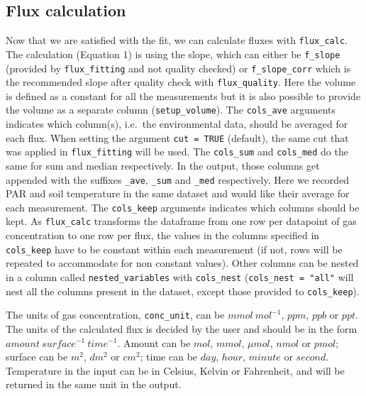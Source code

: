 \documentclass[
  letterpaper,
  DIV=11,
  numbers=noendperiod]{scrartcl}
\begin{document}
\subsection{Flux calculation}\label{sec-excalc}

Now that we are satisfied with the fit, we can calculate fluxes with
\texttt{flux\_calc}. The calculation (Equation 1) is using the slope,
which can either be \texttt{f\_slope} (provided by
\texttt{flux\_fitting} and not quality checked) or
\texttt{f\_slope\_corr} which is the recommended slope after quality
check with \texttt{flux\_quality}. Here the volume is defined as a
constant for all the measurements but it is also possible to provide the
volume as a separate column (\texttt{setup\_volume}). The
\texttt{cols\_ave} arguments indicates which column(s), i.e.~the
environmental data, should be averaged for each flux. When setting the
argument \texttt{cut\ =\ TRUE} (default), the same cut that was applied
in \texttt{flux\_fitting} will be used. The \texttt{cols\_sum} and
\texttt{cols\_med} do the same for sum and median respectively. In the
output, those columns get appended with the suffixes \texttt{\_ave},
\texttt{\_sum} and \texttt{\_med} respectively. Here we recorded PAR and
soil temperature in the same dataset and would like their average for
each measurement. The \texttt{cols\_keep} arguments indicates which
columns should be kept. As \texttt{flux\_calc} transforms the dataframe
from one row per datapoint of gas concentration to one row per flux, the
values in the columns specified in \texttt{cols\_keep} have to be
constant within each measurement (if not, rows will be repeated to
accommodate for non constant values). Other columns can be nested in a
column called \texttt{nested\_variables} with \texttt{cols\_nest}
(\texttt{cols\_nest\ =\ "all"} will nest all the columns present in the
dataset, except those provided to \texttt{cols\_keep}).

The units of gas concentration, \texttt{conc\_unit}, can be
\(mmol\ mol^{-1}\), \(ppm\), \(ppb\) or \(ppt\). The units of the
calculated flux is decided by the user and should be in the form
\(amount\ surface^{-1}\ time^{-1}\). Amount can be \(mol\), \(mmol\),
\(\mu mol\), \(nmol\) or \(pmol\); surface can be \(m^2\), \(dm^2\) or
\(cm^2\); time can be \(day\), \(hour\), \(minute\) or \(second\).
Temperature in the input can be in Celsius, Kelvin or Fahrenheit, and
will be returned in the same unit in the output.
\end{document}
